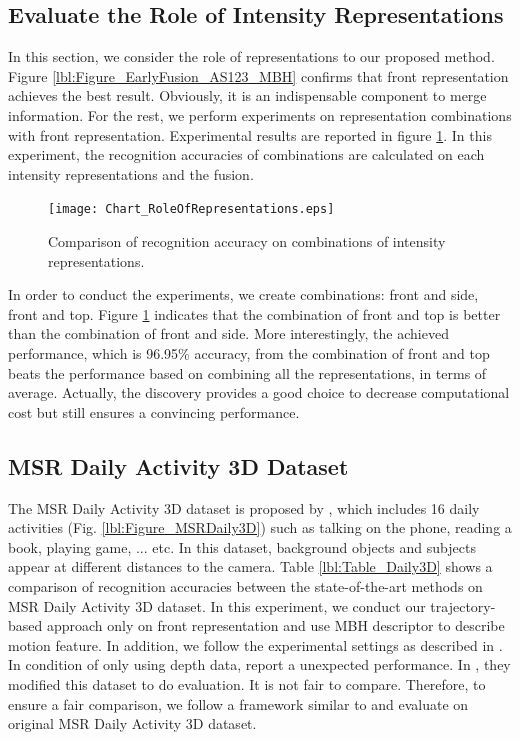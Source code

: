 \documentclass[final,3p,times,twocolumn]{elsarticle}
\begin{document}
\subsection{Evaluate the Role of Intensity Representations}

In this section, we consider the role of representations to our proposed method. Figure \ref{lbl:Figure_EarlyFusion_AS123_MBH} confirms that front representation achieves the best result. Obviously, it is an indispensable component to merge information. For the rest, we perform experiments on representation combinations with front representation. Experimental results are reported in figure \ref{lbl:Figure_CombinationsFRONTSIDETOP}. In this experiment, the recognition accuracies of combinations are calculated on each intensity representations and the fusion.

\begin{figure}[h]
	\begin{center}
		\texttt{[image: Chart\_RoleOfRepresentations.eps]}
	\end{center}
	\caption{\label{lbl:Figure_CombinationsFRONTSIDETOP}Comparison of recognition accuracy on combinations of intensity representations.}
\end{figure}

In order to conduct the experiments, we create combinations: front and side, front and top. Figure \ref{lbl:Figure_CombinationsFRONTSIDETOP} indicates that the combination of front and top is better than the combination of front and side. More interestingly, the achieved performance, which is 96.95\% accuracy, from the combination of front and top beats the performance based on combining all the representations, in terms of average. Actually, the discovery provides a good choice to decrease computational cost but still ensures a convincing performance.

\subsection{MSR Daily Activity 3D Dataset}

 The  MSR Daily Activity 3D dataset is proposed by \cite{wang2012mining}, which includes 16 daily activities  (Fig. \ref{lbl:Figure_MSRDaily3D}) such as talking on the phone, reading a book, playing game, ... etc. In this dataset, background objects and subjects appear at different distances to the camera. Table \ref{lbl:Table_Daily3D} shows a comparison of recognition accuracies between the state-of-the-art methods on MSR Daily Activity 3D dataset. In this experiment, we conduct our trajectory-based approach only on front representation and use MBH descriptor to describe motion feature. In addition, we follow the experimental settings as described in \cite{wang2012mining}. In condition of only using depth data, \cite{wang2012mining, oreifej2013hon4d, xia2013spatio} report a unexpected performance. In \cite{xia2013spatio}, they modified this dataset to do evaluation. It is not fair to compare. Therefore, to ensure a fair comparison, we follow a framework similar to \cite{xia2013spatio} and evaluate on original MSR Daily Activity 3D dataset.
 
\end{document}
